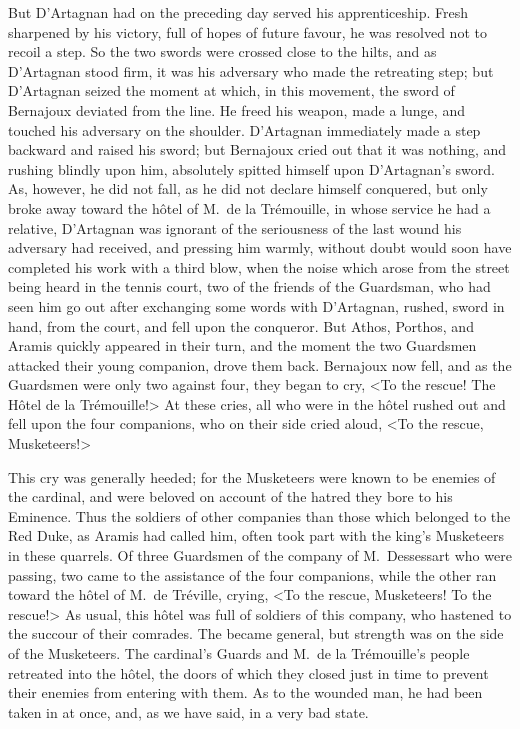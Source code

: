 But D'Artagnan had on the preceding day served his apprenticeship. Fresh sharpened by his victory, full of hopes of future favour, he was resolved not to recoil a step. So the two swords were crossed close to the hilts, and as D'Artagnan stood firm, it was his adversary who made the retreating step; but D'Artagnan seized the moment at which, in this movement, the sword of Bernajoux deviated from the line. He freed his weapon, made a lunge, and touched his adversary on the shoulder. D'Artagnan immediately made a step backward and raised his sword; but Bernajoux cried out that it was nothing, and rushing blindly upon him, absolutely spitted himself upon D'Artagnan's sword. As, however, he did not fall, as he did not declare himself conquered, but only broke away toward the hôtel of M.~de la Trémouille, in whose service he had a relative, D'Artagnan was ignorant of the seriousness of the last wound his adversary had received, and pressing him warmly, without doubt would soon have completed his work with a third blow, when the noise which arose from the street being heard in the tennis court, two of the friends of the Guardsman, who had seen him go out after exchanging some words with D'Artagnan, rushed, sword in hand, from the court, and fell upon the conqueror. But Athos, Porthos, and Aramis quickly appeared in their turn, and the moment the two Guardsmen attacked their young companion, drove them back. Bernajoux now fell, and as the Guardsmen were only two against four, they began to cry, <To the rescue! The Hôtel de la Trémouille!> At these cries, all who were in the hôtel rushed out and fell upon the four companions, who on their side cried aloud, <To the rescue, Musketeers!> 

This cry was generally heeded; for the Musketeers were known to be enemies of the cardinal, and were beloved on account of the hatred they bore to his Eminence. Thus the soldiers of other companies than those which belonged to the Red Duke, as Aramis had called him, often took part with the king's Musketeers in these quarrels. Of three Guardsmen of the company of M.~Dessessart who were passing, two came to the assistance of the four companions, while the other ran toward the hôtel of M.~de Tréville, crying, <To the rescue, Musketeers! To the rescue!> As usual, this hôtel was full of soldiers of this company, who hastened to the succour of their comrades. The  became general, but strength was on the side of the Musketeers. The cardinal's Guards and M.~de la Trémouille's people retreated into the hôtel, the doors of which they closed just in time to prevent their enemies from entering with them. As to the wounded man, he had been taken in at once, and, as we have said, in a very bad state. 

